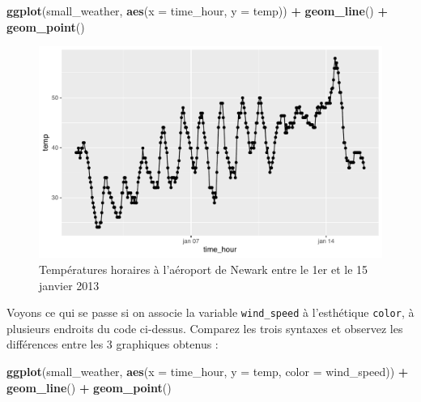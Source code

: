 \documentclass[a4paperpaper,]{article}
\newenvironment{Shaded}{\begin{snugshade}}{\end{snugshade}}
\newcommand{\KeywordTok}[1]{\textcolor[rgb]{0.13,0.29,0.53}{\textbf{#1}}}
\newcommand{\DataTypeTok}[1]{\textcolor[rgb]{0.13,0.29,0.53}{#1}}
\newcommand{\StringTok}[1]{\textcolor[rgb]{0.31,0.60,0.02}{#1}}
\newcommand{\OperatorTok}[1]{\textcolor[rgb]{0.81,0.36,0.00}{\textbf{#1}}}
\newcommand{\NormalTok}[1]{#1}
\theoremstyle{definition}
\theoremstyle{definition}
\theoremstyle{definition}
\theoremstyle{remark}
\begin{document}
\begin{Shaded}
\begin{Highlighting}[]
\KeywordTok{ggplot}\NormalTok{(small_weather, }\KeywordTok{aes}\NormalTok{(}\DataTypeTok{x =}\NormalTok{ time_hour, }\DataTypeTok{y =}\NormalTok{ temp)) }\OperatorTok{+}
\StringTok{  }\KeywordTok{geom_line}\NormalTok{() }\OperatorTok{+}
\StringTok{  }\KeywordTok{geom_point}\NormalTok{()}
\end{Highlighting}
\end{Shaded}

\begin{figure}[htpb]

{\centering \includegraphics[width=0.9\linewidth]{figure/lineplotgraph2-1} 

}

\caption{Températures horaires à l'aéroport de Newark entre le 1er et le 15 janvier 2013}\label{fig:lineplotgraph2}
\end{figure}

Voyons ce qui se passe si on associe la variable \texttt{wind\_speed} à
l'esthétique \texttt{color}, à plusieurs endroits du code ci-dessus.
Comparez les trois syntaxes et observez les différences entre les 3
graphiques obtenus :

\begin{Shaded}
\begin{Highlighting}[]
\KeywordTok{ggplot}\NormalTok{(small_weather, }\KeywordTok{aes}\NormalTok{(}\DataTypeTok{x =}\NormalTok{ time_hour, }\DataTypeTok{y =}\NormalTok{ temp, }\DataTypeTok{color =}\NormalTok{ wind_speed)) }\OperatorTok{+}
\StringTok{  }\KeywordTok{geom_line}\NormalTok{() }\OperatorTok{+}
\StringTok{  }\KeywordTok{geom_point}\NormalTok{()}
\end{Highlighting}
\end{Shaded}
\end{document}
